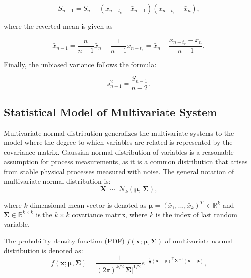 \begin{equation}
S_{n-1} = S_n - (x_{n-t_e} - \bar x_{n-1})(x_{n-t_e} - \bar x_n)\text{,}\label{eq:revrunmean}
\end{equation}

where the reverted mean is given as

\begin{equation}
\bar x_{n-1} = \frac{n}{n-1} \bar x_{n} - \frac{1}{n-1}x_{n-t_e} = \bar x_{n} - \frac{x_{n-t_e} - \bar x_{n}}{n-1}\text{.}\label{eq:revmean}
\end{equation}


Finally, the unbiased variance follows the formula:

\begin{equation}
s^2_{n-1} = \frac{S_{n-1}}{n-2}\text{.}\label{eq:revvar}
\end{equation}

\subsection{Statistical Model of Multivariate System}\label{AA:Distribution}
Multivariate normal distribution generalizes the multivariate systems to the model where the degree to which variables are related is represented by the covariance matrix. Gaussian normal distribution of variables is a reasonable assumption for process measurements, as it is a common distribution that arises from stable physical processes measured with noise. The general notation of multivariate normal distribution is:
\begin{equation}\mathbf{X}\ \sim\ \mathcal{N}_k(\boldsymbol\mu,\, \boldsymbol\Sigma)\text{,}
\end{equation}

where $k$-dimensional mean vector is denoted as \(\boldsymbol\mu = (\bar x_{1},...,\bar x_{k})^T\ \in \mathbb{R}^{k}\) and \(\boldsymbol\Sigma \in \mathbb{R}^{k\times{k}}\) is the $k \times k$ covariance matrix, where \(k\) is the index of last random variable.

The probability density function (PDF) \(f(\boldsymbol{x}; \boldsymbol{\mu}, \boldsymbol{\Sigma})\) of multivariate normal distribution is denoted as:
\begin{equation}
f(\boldsymbol{x}; \boldsymbol{\mu}, \boldsymbol{\Sigma}) = \frac{1}{(2\pi)^{k/2} |\boldsymbol{\Sigma}|^{1/2}} e^{-\frac{1}{2} (\boldsymbol{x}-\boldsymbol{\mu})^\top \boldsymbol{\Sigma}^{-1} (\boldsymbol{x}-\boldsymbol{\mu})}\text{,}
\end{equation}


